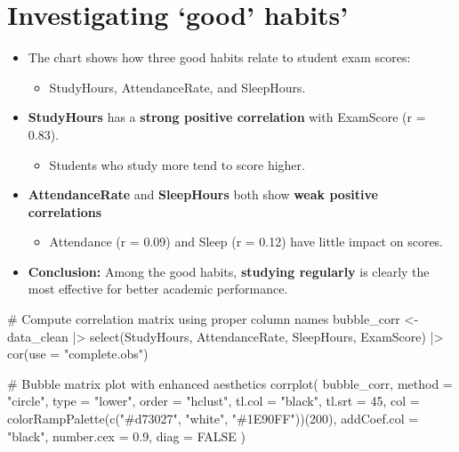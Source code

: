 \documentclass[
  11pt,
  letterpaper,
  DIV=11,
  numbers=noendperiod]{scrartcl}
\newenvironment{Shaded}{\begin{snugshade}}{\end{snugshade}}
\newcommand{\AttributeTok}[1]{\textcolor[rgb]{0.40,0.45,0.13}{#1}}
\newcommand{\CommentTok}[1]{\textcolor[rgb]{0.37,0.37,0.37}{#1}}
\newcommand{\ConstantTok}[1]{\textcolor[rgb]{0.56,0.35,0.01}{#1}}
\newcommand{\DecValTok}[1]{\textcolor[rgb]{0.68,0.00,0.00}{#1}}
\newcommand{\FloatTok}[1]{\textcolor[rgb]{0.68,0.00,0.00}{#1}}
\newcommand{\FunctionTok}[1]{\textcolor[rgb]{0.28,0.35,0.67}{#1}}
\newcommand{\NormalTok}[1]{\textcolor[rgb]{0.00,0.23,0.31}{#1}}
\newcommand{\OtherTok}[1]{\textcolor[rgb]{0.00,0.23,0.31}{#1}}
\newcommand{\SpecialCharTok}[1]{\textcolor[rgb]{0.37,0.37,0.37}{#1}}
\newcommand{\StringTok}[1]{\textcolor[rgb]{0.13,0.47,0.30}{#1}}
\providecommand{\tightlist}{%
  \setlength{\itemsep}{0pt}\setlength{\parskip}{0pt}}\usepackage{longtable,booktabs,array}
\begin{document}
\section{Investigating `good' habits'}\label{investigating-good-habits}

\begin{itemize}
\item
  The chart shows how three good habits relate to student exam scores:

  \begin{itemize}
  \tightlist
  \item
    StudyHours, AttendanceRate, and SleepHours.
  \end{itemize}
\item
  \textbf{StudyHours} has a \textbf{strong positive correlation} with
  ExamScore (r = 0.83).

  \begin{itemize}
  \tightlist
  \item
    Students who study more tend to score higher.
  \end{itemize}
\item
  \textbf{AttendanceRate} and \textbf{SleepHours} both show \textbf{weak
  positive correlations}

  \begin{itemize}
  \tightlist
  \item
    Attendance (r = 0.09) and Sleep (r = 0.12) have little impact on
    scores.
  \end{itemize}
\item
  \textbf{Conclusion:} Among the good habits, \textbf{studying
  regularly} is clearly the most effective for better academic
  performance.
\end{itemize}

\begin{Shaded}
\begin{Highlighting}[]
\CommentTok{\# Compute correlation matrix using proper column names}
\NormalTok{bubble\_corr }\OtherTok{\textless{}{-}}\NormalTok{ data\_clean }\SpecialCharTok{|\textgreater{}}
  \FunctionTok{select}\NormalTok{(StudyHours, AttendanceRate, SleepHours, ExamScore) }\SpecialCharTok{|\textgreater{}}
  \FunctionTok{cor}\NormalTok{(}\AttributeTok{use =} \StringTok{"complete.obs"}\NormalTok{)}

\CommentTok{\# Bubble matrix plot with enhanced aesthetics}
\FunctionTok{corrplot}\NormalTok{(}
\NormalTok{  bubble\_corr,}
  \AttributeTok{method =} \StringTok{"circle"}\NormalTok{,}
  \AttributeTok{type =} \StringTok{"lower"}\NormalTok{,}
  \AttributeTok{order =} \StringTok{"hclust"}\NormalTok{,}
  \AttributeTok{tl.col =} \StringTok{"black"}\NormalTok{,}
  \AttributeTok{tl.srt =} \DecValTok{45}\NormalTok{,}
  \AttributeTok{col =} \FunctionTok{colorRampPalette}\NormalTok{(}\FunctionTok{c}\NormalTok{(}\StringTok{"\#d73027"}\NormalTok{, }\StringTok{"white"}\NormalTok{, }\StringTok{"\#1E90FF"}\NormalTok{))(}\DecValTok{200}\NormalTok{),}
  \AttributeTok{addCoef.col =} \StringTok{"black"}\NormalTok{,}
  \AttributeTok{number.cex =} \FloatTok{0.9}\NormalTok{,}
  \AttributeTok{diag =} \ConstantTok{FALSE}
\NormalTok{)}
\end{Highlighting}
\end{Shaded}
\end{document}
